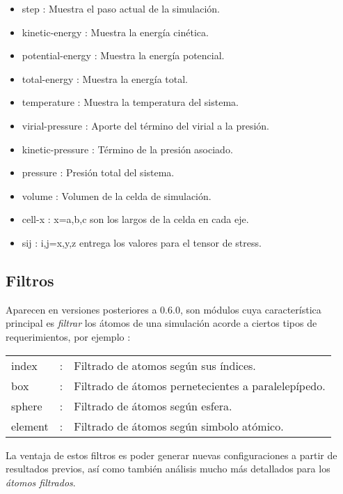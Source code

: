 \begin{itemize}
 \item step : Muestra el paso actual de la simulaci\'on.
 \item kinetic-energy : Muestra la energ\'ia cin\'etica.
 \item potential-energy : Muestra la energ\'ia potencial.
 \item total-energy : Muestra la energ\'ia total.
 \item temperature : Muestra la temperatura del sistema.
 \item virial-pressure : Aporte del t\'ermino del virial a la presi\'on.
 \item kinetic-pressure : T\'ermino de la presi\'on asociado.
 \item pressure : Presi\'on total del sistema.
 \item volume : Volumen de la celda de simulaci\'on.
 \item cell-x : x=a,b,c son los largos de la celda en cada eje.
 \item sij : i,j=x,y,z entrega los valores para el tensor de stress.
\end{itemize}

\subsection{Filtros}

Aparecen en versiones posteriores a 0.6.0, son m\'odulos cuya caracter\'istica principal es \textit{filtrar} los \'atomos de una simulaci\'on acorde a ciertos tipos de requerimientos, por ejemplo :

\vspace{1cm}
\begin{center}
\begin{tabular}{lcl}
index &:& Filtrado de atomos seg\'un sus \'indices.\\
box &:& Filtrado de \'atomos pernetecientes a paralelep\'ipedo.\\
sphere &:& Filtrado de \'atomos seg\'un esfera.\\  
element &:& Filtrado de \'atomos seg\'un simbolo at\'omico.\\
\end{tabular}
\end{center}
\vspace{1cm}

La ventaja de estos filtros es poder generar nuevas configuraciones a partir de resultados previos, as\'i como tambi\'en an\'alisis mucho m\'as detallados para los \textit{\'atomos filtrados}.


